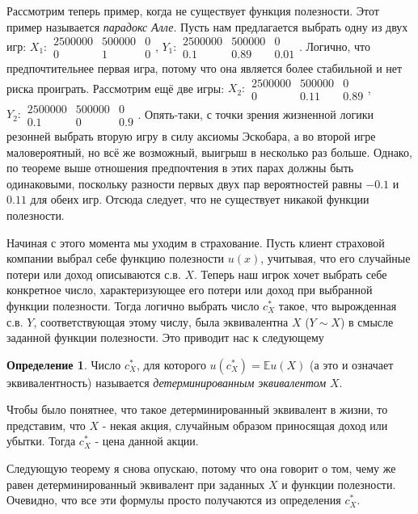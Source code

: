 \documentclass{article}
\theoremstyle{definition}
\newtheorem{definition}{Определение}
\begin{document}
Рассмотрим теперь пример, когда не существует функция полезности. Этот пример называется \textit{парадокс Алле}.
Пусть нам предлагается выбрать одну из двух игр: $X_1: \begin{smallmatrix}
2500000 & 500000 & 0 \\
0 & 1 & 0
\end{smallmatrix}$, $Y_1: \begin{smallmatrix}
2500000 & 500000 & 0 \\
0.1 & 0.89 & 0.01
\end{smallmatrix}$. Логично, что предпочтительнее первая игра, потому что она является более стабильной и нет риска проиграть. Рассмотрим ещё две игры: $X_2: \begin{smallmatrix}
2500000 & 500000 & 0 \\
0 & 0.11 & 0.89
\end{smallmatrix}$, $Y_2: \begin{smallmatrix}
2500000 & 500000 & 0 \\
0.1 & 0 & 0.9
\end{smallmatrix}$. Опять-таки, с точки зрения жизненной логики резонней выбрать вторую игру в силу аксиомы Эскобара, а во второй игре маловероятный, но всё же возможный, выигрыш в несколько раз больше. Однако, по теореме выше отношения предпочтения в этих парах должны быть одинаковыми, поскольку разности первых двух пар вероятностей равны $-0.1$ и $0.11$ для обеих игр. Отсюда следует, что не существует никакой функции полезности.

Начиная с этого момента мы уходим в страхование. Пусть клиент страховой компании выбрал себе функцию полезности $u(x)$, учитывая, что его случайные потери или доход описываются с.в. $X$. Теперь наш игрок хочет выбрать себе конкретное число, характеризующее его потери или доход при выбранной функции полезности. Тогда логично выбрать число $c_X^*$ такое, что вырожденная с.в. $Y$, соответствующая этому числу, была эквивалентна $X$ ($Y \sim X$) в смысле заданной функции полезности. Это приводит нас к следующему
\begin{definition}
Число $c_X^*$, для которого $u(c_X^*) = \mathbb{E}u(X)$ (а это и означает эквивалентность) называется \textit{детерминированным эквивалентом} $X$.
\end{definition}
Чтобы было понятнее, что такое детерминированный эквивалент в жизни, то представим, что $X$ - некая акция, случайным образом приносящая доход или убытки. Тогда $c_X^*$ - цена данной акции.

Следующую теорему я снова опускаю, потому что она говорит о том, чему же равен детерминированный эквивалент при заданных $X$ и функции полезности. Очевидно, что все эти формулы просто получаются из определения $c_X^*$.
\end{document}
